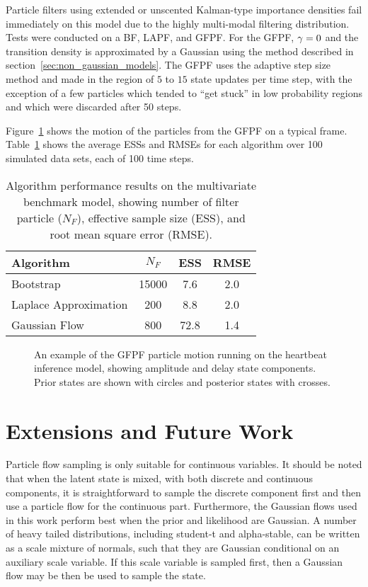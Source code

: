 \documentclass[12pt]{article}
\begin{document}
Particle filters using extended or unscented Kalman-type importance densities fail immediately on this model due to the highly multi-modal filtering distribution. Tests were conducted on a BF, LAPF, and GFPF. For the GFPF, $\gamma=0$ and the transition density is approximated by a Gaussian using the method described in section~\ref{sec:non_gaussian_models}. The GFPF uses the adaptive step size method and made in the region of $5$ to $15$ state updates per time step, with the exception of a few particles which tended to ``get stuck'' in low probability regions and which were discarded after 50 steps.

Figure~\ref{fig:sineha_example_frame} shows the motion of the particles from the GFPF on a typical frame. Table~\ref{tab:sineha_results} shows the average ESSs and RMSEs for each algorithm over 100 simulated data sets, each of 100 time steps.
%
\begin{table}
\centering
\begin{tabular}{l||c|c|c}
Algorithm                                & $N_F$ & ESS  & RMSE \\
\hline
Bootstrap                                & 15000 &  7.6 &  2.0 \\
Laplace Approximation                    &   200 &  8.8 &  2.0 \\
Gaussian Flow                            &   800 & 72.8 &  1.4 \\
\end{tabular}
\caption{Algorithm performance results on the multivariate benchmark model, showing number of filter particle ($N_F$), effective sample size (ESS), and root mean square error (RMSE).}
\label{tab:sineha_results}
\end{table}
%
\begin{figure}
\centering

\caption{An example of the GFPF particle motion running on the heartbeat inference model, showing amplitude and delay state components. Prior states are shown with circles and posterior states with crosses.}
\label{fig:sineha_example_frame}
\end{figure}



\section{Extensions and Future Work}

Particle flow sampling is only suitable for continuous variables. It should be noted that when the latent state is mixed, with both discrete and continuous components, it is straightforward to sample the discrete component first and then use a particle flow for the continuous part. Furthermore, the Gaussian flows used in this work perform best when the prior and likelihood are Gaussian. A number of heavy tailed distributions, including student-t and alpha-stable, can be written as a scale mixture of normals, such that they are Gaussian conditional on an auxiliary scale variable. If this scale variable is sampled first, then a Gaussian flow may be then be used to sample the state.
\end{document}
